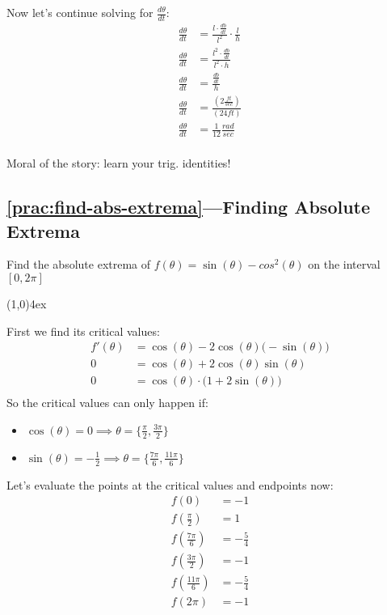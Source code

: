 \documentclass{MathNotes}
\newcommand{\continued}{
	\mbox{}
	\vfill
	\textbf{Continued on Next Page\ldots}\newpage
}
\newcommand{\br}{
	\begin{center}
		\line(1,0){4ex}
	\end{center}}
\begin{document}
Now let's continue solving for $\frac{d\theta}{dt}$:
\begin{align*}
	\frac{d\theta}{dt} & =\frac{l\cdot\frac{db}{dt}}{l^2}\cdot\frac{l}{h} \\
	\frac{d\theta}{dt} & =\frac{l^2\cdot\frac{db}{dt}}{l^2\cdot h}        \\
	\frac{d\theta}{dt} & =\frac{\frac{db}{dt}}{h}                         \\
	\frac{d\theta}{dt} & =\frac{(2\frac{ft}{sec})}{(24ft)}                \\
	\frac{d\theta}{dt} & =\frac{1}{12}\frac{rad}{sec}                     \\
\end{align*}

Moral of the story: learn your trig. identities!
\newpage
\subsection*{\ref{prac:find-abs-extrema}---Finding Absolute Extrema}\label{ans:find-abs-extrema}
Find the absolute extrema of $f(\theta)=\sin(\theta)-cos^2(\theta)$ on
the interval $[0, 2\pi]$
\br
First we find its critical values:
\begin{align*}
	f'(\theta) & =\cos(\theta)-2\cos(\theta)\big(-\sin(\theta)\big) \\
	0          & =\cos(\theta)+2\cos(\theta)\sin(\theta)            \\
	0          & =\cos(\theta)\cdot\big(1+2\sin(\theta)\big)        \\
\end{align*}
So the critical values can only happen if:
\begin{multicols}{2}
	\begin{itemize}
		\item $\cos(\theta)=0\implies\theta=\{\frac{\pi}{2}, \frac{3\pi}{2}\}$
		\item $\sin(\theta)=-\frac{1}{2}\implies\theta=\{\frac{7\pi}{6},
			      \frac{11\pi}{6}\}$
	\end{itemize}
\end{multicols}

Let's evaluate the points at the critical values and endpoints now:
\begin{align*}
	f(0)               & =-1           \\
	f(\frac{\pi}{2})   & =1            \\
	f(\frac{7\pi}{6})  & =-\frac{5}{4} \\
	f(\frac{3\pi}{2})  & =-1           \\
	f(\frac{11\pi}{6}) & =-\frac{5}{4} \\
	f(2\pi)            & =-1           \\
\end{align*}
\end{document}
